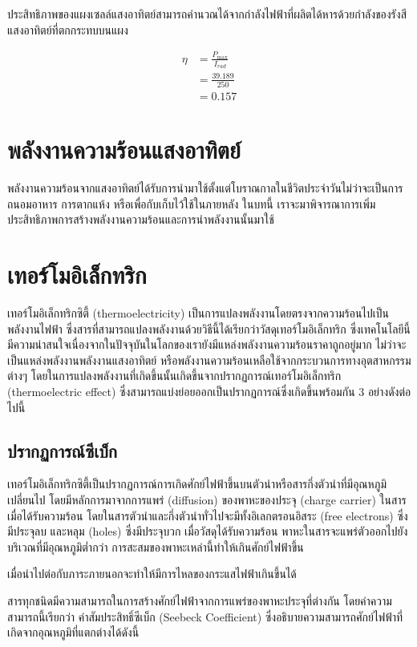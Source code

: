 \documentclass[a4paper,nobib,openany,10pt]{tufte-book}
\begin{document}
ประสิทธิภาพของแผงเซลล์แสงอาทิตย์สามารถคำนวณได้จากกำลังไฟฟ้าที่ผลิตได้หารด้วยกำลังของรังสีแสงอาทิตย์ที่ตกกระทบบนแผง

\begin{align*}
  \eta &= \frac{P_{\max}}{I_{rad}} \\
       &= \frac{39.189}{250} \\
&= 0.157
\end{align*}

\chapter{พลังงานความร้อนแสงอาทิตย์}
\label{sec:org6364795}
พลังงานความร้อนจากแสงอาทิตย์ได้รับการนำมาใช้ตั้งแต่โบราณกาลในชีวิตประจำวันไม่ว่าจะเป็นการถนอมอาหาร
การตากแห้ง หรือเพื่อกับเก็บไว้ใช้ในภายหลัง ในบทนี้
เราจะมาพิจารณาการเพิ่มประสิทธิภาพการสร้างพลังงานความร้อนและการนำพลังงานนั้นมาใช้

\chapter{เทอร์โมอิเล็กทริก}
\label{sec:org0541ad0}
เทอร์โมอิเล็กทริกซิตี้ (thermoelectricity) เป็นการแปลงพลังงานโดยตรงจากความร้อนไปเป็นพลังงานไฟฟ้า
ซึ่งสารที่สามารถแปลงพลังงานด้วยวิธีนี้ได้เรียกว่าวัสดุเทอร์โมอิเล็กทริก
ซึ่งเทคโนโลยีนี้มีความน่าสนใจเนื่องจากในปัจจุบันในโลกของเรายังมีแหล่งพลังงานความร้อนราคาถูกอยู่มาก
ไม่ว่าจะเป็นแหล่งพลังงานพลังงานแสงอาทิตย์ หรือพลังงานความร้อนเหลือใช้จากกระบวนการทางอุตสาหกรรมต่างๆ
โดยในการแปลงพลังงานที่เกิดขึ้นนั้นเกิดขึ้นจากปรากฏการณ์เทอร์โมอิเล็กทริก
(thermoelectric effect)
ซึ่งสามารถแบ่งย่อยออกเป็นปรากฏการณ์ซึ่งเกิดขึ้นพร้อมกัน 3
อย่างดังต่อไปนี้

\section{ปรากฏการณ์ซีเบ็ก}
\label{sec:org9de078c}
เทอร์โมอิเล็กทริกซิตี้เป็นปรากฏการณ์การเกิดศักย์ไฟฟ้าขึ้นบนตัวนำหรือสารกึ่งตัวนำที่มีอุณหภูมิเปลี่ยนไป
โดยมีหลักการมาจากการแพร่ (diffusion) ของพาหะของประจุ (charge carrier)
ในสารเมื่อได้รับความร้อน
โดยในสารตัวนำและกึ่งตัวนำทั่วไปจะมีทั้งอิเลกตรอนอิสระ (free electrons)
ซึ่งมีประจุลบ และหลุม (holes) ซึ่งมีประจุบวก เมื่อวัสดุได้รับความร้อน
พาหะในสารจะแพร่ตัวออกไปยังบริเวณที่มีอุณหภูมิต่ำกว่า
การสะสมของพาหะเหล่านี้ทำให้เกินศักย์ไฟฟ้าขึ้น

เมื่อนำไปต่อกับภาระภายนอกจะทำให้มีการไหลของกระแสไฟฟ้าเกินขึ้นได้

สารทุกชนิดมีความสามารถในการสร้างศักย์ไฟฟ้าจากการแพร่ของพาหะประจุที่ต่างกัน
โดยค่าความสามารถนี้เรียกว่า ค่าสัมประสิทธิ์ซีเบ็ก (Seebeck Coefficient)
ซึ่งอธิบายความสามารถศักย์ไฟฟ้าที่เกิดจากอุณหภูมิที่แตกต่างได้ดังนี้
\end{document}
